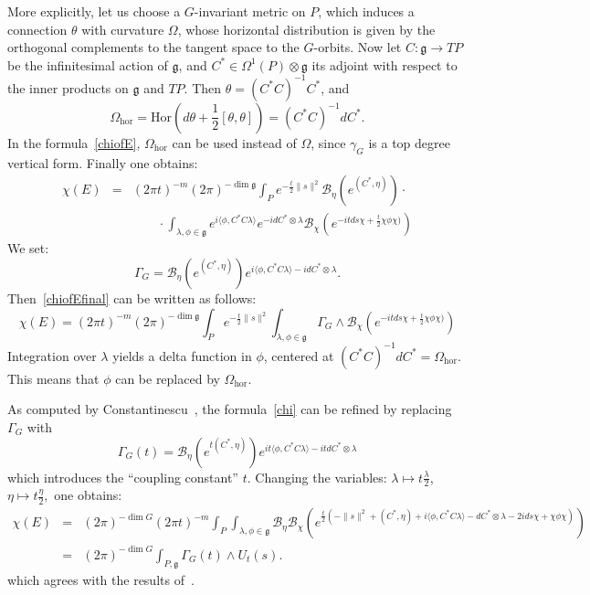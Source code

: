 \documentclass[a4paper,12pt,reqno,sumlimits]{amsart}
\theoremstyle{plain}
\theoremstyle{definition}
\newcommand{\1}{{\bf 1}}
\newcommand{\g}{{\mathfrak  g}}
\newcommand{\ex}[1]{{e^{#1}}}
\newcommand{\calB}{{\mathcal B}}
\renewcommand{\to}{\longrightarrow}
\newcommand{\inv}{^{-1}}
\newcommand{\ip}[1]{\langle #1 \rangle}
\newcommand{\norm}[1]{\| #1 \|}
\numberwithin{equation}{section}
\begin{document}
More explicitly, let us choose a $G$-invariant metric on $P$, which induces a
connection $\theta$ with curvature $\Omega$, whose horizontal distribution is
given by the orthogonal complements to the tangent space to the $G$-orbits.
Now let $C:\g\to TP$ be the infinitesimal action of $\g$, and
$C^*\in\Omega^1(P)\otimes\g$ its adjoint with respect to the inner products
on $\g$ and $TP$. Then $\theta=(C^*C)\inv C^*$, and
$$
\Omega_{\text{hor}}=\text{Hor}\left(d\theta +
  \frac{1}{2}[\theta,\theta]\right)=(C^*C)\inv dC^*.
$$
In the formula~\eqref{chiofE}, $\Omega_{\text{hor}}$ can be used instead of
$\Omega$, since $\gamma_G$ is a top degree vertical form.  Finally one
obtains:
\begin{eqnarray}
  \label{chiofEfinal}
  \chi(E)&=&(2\pi t)^{-m}(2\pi)^{-\dim\g}\int_P\ex{-\frac{t}{2}\norm{s}^2}
  \calB_\eta\left(\ex{(C^*,\eta)}\right)\cdot\nonumber\\
  &&\qquad\cdot\int_{\lambda,\phi\in\g}
  \ex{i\ip{\phi,C^*C\lambda}}\ex{-idC^*\otimes\lambda}
  \calB_\chi\left(\ex{-itds\chi+\frac{t}{2}\chi\phi\chi)}\right)
\end{eqnarray}
We set:
$$
\Gamma_G=\calB_\eta\left(\ex{(C^*,\eta)}\right)
\ex{i\ip{\phi,C^*C\lambda}-idC^*\otimes\lambda}.
$$
Then~\eqref{chiofEfinal} can be written as follows:
\begin{equation}
  \label{chi}
  \chi(E)=(2\pi t)^{-m}(2\pi)^{-\dim\g}\int_P\ex{-\frac{t}{2}\norm{s}^2}
  \int_{\lambda,\phi\in\g}\Gamma_G\wedge
  \calB_\chi\left(\ex{-itds\chi+\frac{t}{2}\chi\phi\chi)}\right)
\end{equation}
Integration over $\lambda$ yields a delta function in $\phi$, centered at
$(C^*C)\inv dC^*=\Omega_{\text{hor}}$. This means that $\phi$ can be replaced
by $\Omega_{\text{hor}}$.

As computed by Constantinescu~\cite[Sec. 2.4, 2.6]{radu}, the
formula~\eqref{chi} can be refined by replacing $\Gamma_G$ with
$$
\Gamma_G(t)=\calB_\eta\left(\ex{t(C^*,\eta)}\right)
\ex{it\ip{\phi,C^*C\lambda}-itdC^*\otimes\lambda}
$$
which introduces the ``coupling constant'' $t$.  Changing the variables:
$\lambda\mapsto t\frac{\lambda}{2}$, $\eta\mapsto t\frac{\eta}{2},$ one
obtains:
\begin{eqnarray*}
  \chi(E)&=&(2\pi)^{-\dim G}(2\pi t)^{-m}\int_P\int_{\lambda,\phi\in\g}
  \calB_\eta\calB_\chi\left(e^{\frac{t}{2}(-\norm{s}^2 + (C^*,\eta) +
      i\ip{\phi,C^*C\lambda}-dC^*\otimes\lambda-2ids\chi+\chi\phi\chi)}\right)\\
  &=&(2\pi)^{-\dim G}\int_{P,\g}\Gamma_G(t)\wedge U_t(s).
\end{eqnarray*}
which agrees with the results of~\cite{aj}.
\end{document}
